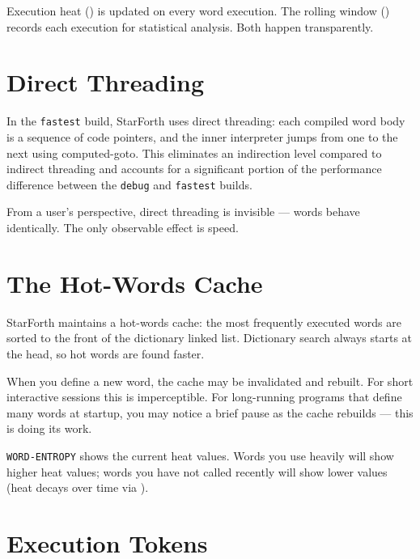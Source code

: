 Execution heat () is updated on every word execution. The rolling
window () records each execution for statistical analysis. Both
happen transparently.

\section{Direct Threading}
\label{sec:direct-threading}

In the \texttt{fastest} build, StarForth uses direct threading: each
compiled word body is a sequence of code pointers, and the inner interpreter
jumps from one to the next using computed-goto. This eliminates an indirection
level compared to indirect threading and accounts for a significant portion of
the performance difference between the \texttt{debug} and \texttt{fastest}
builds.

From a user's perspective, direct threading is invisible --- words behave
identically. The only observable effect is speed.

\section{The Hot-Words Cache}
\label{sec:hot-words-cache}

StarForth maintains a hot-words cache: the most frequently executed words are
sorted to the front of the dictionary linked list. Dictionary search always
starts at the head, so hot words are found faster.

When you define a new word, the cache may be invalidated and rebuilt. For
short interactive sessions this is imperceptible. For long-running programs
that define many words at startup, you may notice a brief pause as the cache
rebuilds --- this is  doing its work.

\texttt{WORD-ENTROPY} shows the current heat values. Words you use heavily
will show higher heat values; words you have not called recently will show
lower values (heat decays over time via ).

\section{Execution Tokens}
\label{sec:execution-tokens}

